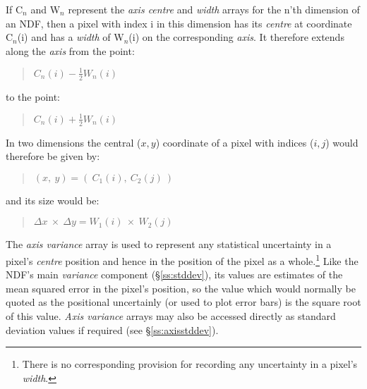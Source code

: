\documentclass[twoside,11pt]{article}
\newcommand{\st}[1]{{\em{#1}}}
\begin{document}
If C$_{n}$ and W$_{n}$ represent the \st{axis centre\/} and \st{width\/}
arrays for the n'th dimension of an NDF, then a pixel with index i in this
dimension has its \st{centre\/} at coordinate C$_{n}$(i) and has a
\st{width\/} of W$_{n}$(i) on the corresponding \st{axis}.  
It therefore extends along the \st{axis\/} from the point:

\small
\begin{quote}
\begin{center}
$C_{n}(i) - \frac{1}{2} W_{n}(i)$
\end{center}
\end{quote}
\normalsize

to the point:

\small
\begin{quote}
\begin{center}
$C_{n}(i) + \frac{1}{2} W_{n}(i)$
\end{center}
\end{quote}
\normalsize

In two dimensions the central ($x,y$) coordinate of a pixel with indices
($i,j$) would therefore be given by: 

\small
\begin{quote}
\begin{center}
$(x,\: y) = (\: C_{1}(i),\: C_{2}(j) \: )$
\end{center}
\end{quote}
\normalsize

and its size would be: 

\small
\begin{quote}
\begin{center}
$\Delta x \: \times \: \Delta y = W_{1}(i) \: \times \: W_{2}(j)$
\end{center}
\end{quote}
\normalsize

The \st{axis variance\/} array is used to represent any statistical
uncertainty in a pixel's \st{centre\/} position and hence in the position
of the pixel as a whole.\footnote{There is no corresponding provision for
recording any uncertainty in a pixel's \st{width}.} 
Like the NDF's main \st{variance\/} component (\S\ref{ss:stddev}), its
values are estimates of the mean squared error in the pixel's position, so
the value which would normally be quoted as the positional uncertainly (or
used to plot error bars) is the square root of this value. 
\st{Axis variance\/} arrays may also be accessed directly as standard
deviation values if required (see \S\ref{ss:axisstddev}). 
\end{document}
